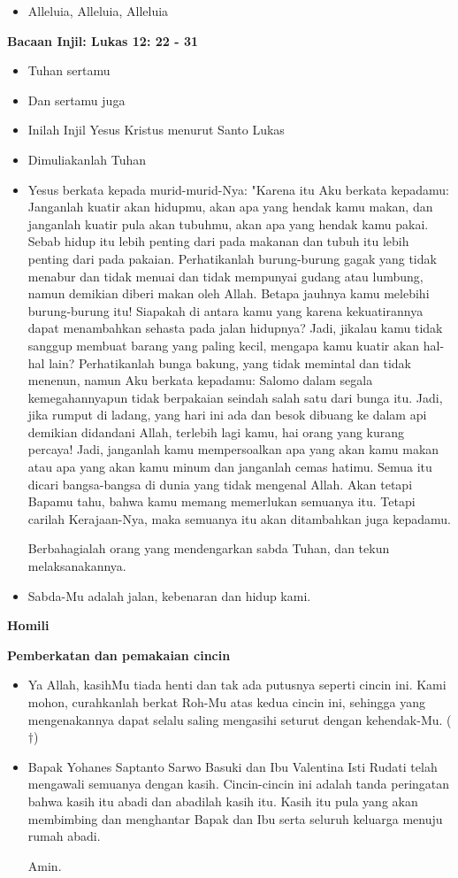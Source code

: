 \documentclass[12pt,two pages]{scrbook}
\makeatletter
\newcommand{\subjudul}[1]{%
  {\parindent \z@ \normalfont
    \interlinepenalty\@M \bfseries #1\par\nobreak \vskip 20\p@ }}
\newcommand{\BU}[1]{\begin{itemize} \item[U:] #1 \end{itemize}}
\newcommand{\BI}[1]{\begin{itemize} \item[I:] #1 \end{itemize}}
\newcommand{\suami}{Yohanes Saptanto Sarwo Basuki }
\newcommand{\istri}{Valentina Isti Rudati }
\makeatother
\begin{document}
\BU{Alleluia, Alleluia, Alleluia} 

\subjudul{Bacaan Injil: Lukas 12: 22 - 31}

\BI{Tuhan sertamu}

\BU{Dan sertamu juga}

\BI{Inilah Injil Yesus Kristus menurut Santo Lukas}

\BU{Dimuliakanlah Tuhan}

\BI{Yesus berkata kepada murid-murid-Nya: "Karena itu Aku berkata kepadamu: Janganlah kuatir akan hidupmu, akan apa yang hendak kamu makan, dan janganlah kuatir pula akan tubuhmu, akan apa yang hendak kamu pakai.
Sebab hidup itu lebih penting dari pada makanan dan tubuh itu lebih penting dari pada pakaian.
Perhatikanlah burung-burung gagak yang tidak menabur dan tidak menuai dan tidak mempunyai gudang atau lumbung, namun demikian diberi makan oleh Allah. Betapa jauhnya kamu melebihi burung-burung itu!
Siapakah di antara kamu yang karena kekuatirannya dapat menambahkan sehasta pada jalan hidupnya?
Jadi, jikalau kamu tidak sanggup membuat barang yang paling kecil, mengapa kamu kuatir akan hal-hal lain?
Perhatikanlah bunga bakung, yang tidak memintal dan tidak menenun, namun Aku berkata kepadamu: Salomo dalam segala kemegahannyapun tidak berpakaian seindah salah satu dari bunga itu.
Jadi, jika rumput di ladang, yang hari ini ada dan besok dibuang ke dalam api demikian didandani Allah, terlebih lagi kamu, hai orang yang kurang percaya!
Jadi, janganlah kamu mempersoalkan apa yang akan kamu makan atau apa yang akan kamu minum dan janganlah cemas hatimu.
Semua itu dicari bangsa-bangsa di dunia yang tidak mengenal Allah. Akan tetapi Bapamu tahu, bahwa kamu memang memerlukan semuanya itu.
Tetapi carilah Kerajaan-Nya, maka semuanya itu akan ditambahkan juga kepadamu.

Berbahagialah orang yang mendengarkan sabda Tuhan, dan tekun melaksanakannya.}

\BU{Sabda-Mu adalah jalan, kebenaran dan hidup kami.}

\subjudul{Homili}

\subjudul{Pemberkatan dan pemakaian cincin}

\BI{Ya Allah, kasihMu tiada henti dan tak ada putusnya seperti cincin ini. Kami mohon, curahkanlah berkat Roh-Mu atas kedua cincin ini, sehingga yang mengenakannya dapat selalu saling mengasihi seturut dengan kehendak-Mu. ({\Large{$\dagger$}})}

\BI{Bapak \suami dan Ibu \istri telah mengawali semuanya dengan kasih. Cincin-cincin ini adalah tanda peringatan bahwa kasih itu abadi dan abadilah kasih itu. Kasih itu pula yang akan membimbing dan menghantar Bapak dan Ibu serta seluruh keluarga menuju rumah abadi.

Amin.}
\end{document}
